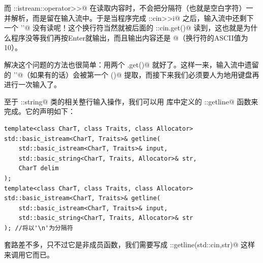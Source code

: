 而 \lstinline@std::istream::operator>>@ 在读取内容时，不会把分隔符（也就是空白字符）一并解析，而是留在输入流中。于是当程序完成 \lstinline@std::cin>>i@ 之后，输入流中还剩下一个 \lstinline@'\n'@ 没有读呢！这个换行符当然就被后面的 \lstinline@std::cin.get()@ 读到，这也就是为什么程序没等我们再按Enter就输出，而且输出内容还是 @（换行符的ASCII值为10）。\par
解决这个问题的方法也很简单：用两个 \lstinline@cin.get()@ 就好了。这样一来，输入流中遗留的 \lstinline@'\n'@（如果有的话）会被第一个 \lstinline@get()@ 提取，而接下来我们必须要人为地用键盘再进行一次输入了。\par
至于 \lstinline@std::string@ 类的相关整行输入操作，我们可以用 \lstinline@string@ 库中定义的 \lstinline@std::getline@ 函数来完成。它的声明如下：
\begin{lstlisting}
template<class CharT, class Traits, class Allocator>
std::basic_istream<CharT, Traits>& getline(
    std::basic_istream<CharT, Traits>& input,
    std::basic_string<CharT, Traits, Allocator>& str,
    CharT delim
);
template<class CharT, class Traits, class Allocator>
std::basic_istream<CharT, Traits>& getline(
    std::basic_istream<CharT, Traits>& input,
    std::basic_string<CharT, Traits, Allocator>& str
); //将以'\n'为分隔符
\end{lstlisting}\par
套路差不多，只不过它是非成员函数，我们需要写成 \lstinline@std::getline(std::cin,str)@ 这样来调用它而已。\par
